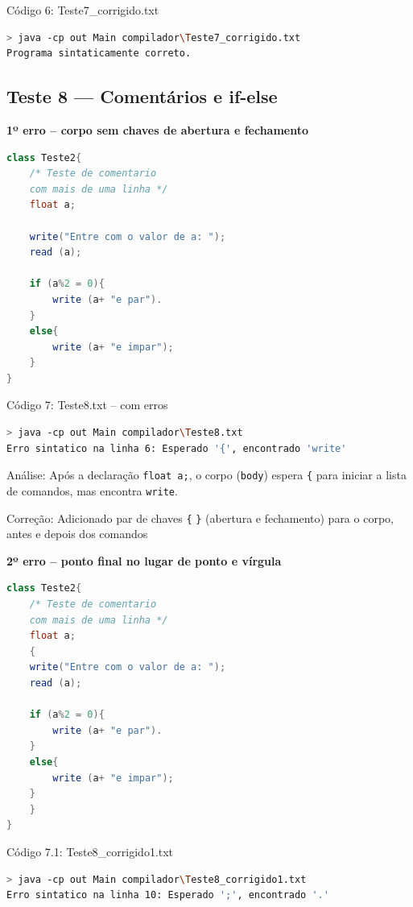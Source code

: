 \documentclass[12pt,a4paper]{article}
\begin{document}
Código 6: Teste7\_corrigido.txt

\begin{lstlisting}[language=bash]
> java -cp out Main compilador\Teste7_corrigido.txt
Programa sintaticamente correto.
\end{lstlisting}

\subsection{Teste 8 --- Comentários e if-else}

\textbf{1º erro -- corpo sem chaves de abertura e fechamento}

\begin{lstlisting}[language=Java]
class Teste2{
    /* Teste de comentario
    com mais de uma linha */
    float a;

    write("Entre com o valor de a: ");
    read (a);

    if (a%2 = 0){
        write (a+ "e par").
    }
    else{
        write (a+ "e impar");
    }
}
\end{lstlisting}

Código 7: Teste8.txt -- com erros

\begin{lstlisting}[language=bash]
> java -cp out Main compilador\Teste8.txt
Erro sintatico na linha 6: Esperado '{', encontrado 'write'
\end{lstlisting}

Análise: Após a declaração \texttt{float a;}, o corpo (\texttt{body}) espera \texttt{\{} para iniciar a lista de comandos, mas encontra \texttt{write}.

Correção: Adicionado par de chaves \texttt{\{} \texttt{\}} (abertura e fechamento) para o corpo, antes e depois dos comandos

\textbf{2º erro -- ponto final no lugar de ponto e vírgula}

\begin{lstlisting}[language=Java]
class Teste2{
    /* Teste de comentario
    com mais de uma linha */
    float a;
    {
    write("Entre com o valor de a: ");
    read (a);

    if (a%2 = 0){
        write (a+ "e par").
    }
    else{
        write (a+ "e impar");
    }
    }
}
\end{lstlisting}

Código 7.1: Teste8\_corrigido1.txt

\begin{lstlisting}[language=bash]
> java -cp out Main compilador\Teste8_corrigido1.txt
Erro sintatico na linha 10: Esperado ';', encontrado '.'
\end{lstlisting}
\end{document}
